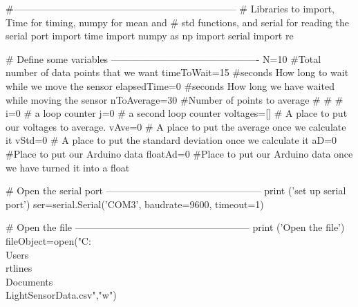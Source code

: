 \begin{python}
#---------------------------------------------------------------------
# Libraries to import, Time for timing, numpy for mean and  
#   std functions, and serial for reading the serial port
import time
import numpy as np
import serial
import re
 
 
# Define some variables ----------------------------------------------
N=10
#Total number of data points that we want
timeToWait=15   #seconds How long to wait while we move the sensor
elapsedTime=0   #seconds How long we have waited while moving the sensor
nToAverage=30   #Number of points to average
# # #
i=0             # a loop counter
j=0             # a second loop counter
voltages=[]     # A place to put our voltages to average.
vAve=0          # A place to put the average once we calculate it
vStd=0          # A place to put the standard deviation once we calculate it
aD=0            #Place to put our Arduino data 
floatAd=0       #Place to put our Arduino data once we have turned it into a float
 
# Open the serial port ------------------------------------------------
print ('set up serial port')
ser=serial.Serial('COM3', baudrate=9600, timeout=1)
 
 
# Open the file ------------------------------------------------------
print ('Open the file')
fileObject=open("C:\\Users\\rtlines\\Documents\\LightSensorData.csv","w")
 

\end{python}
